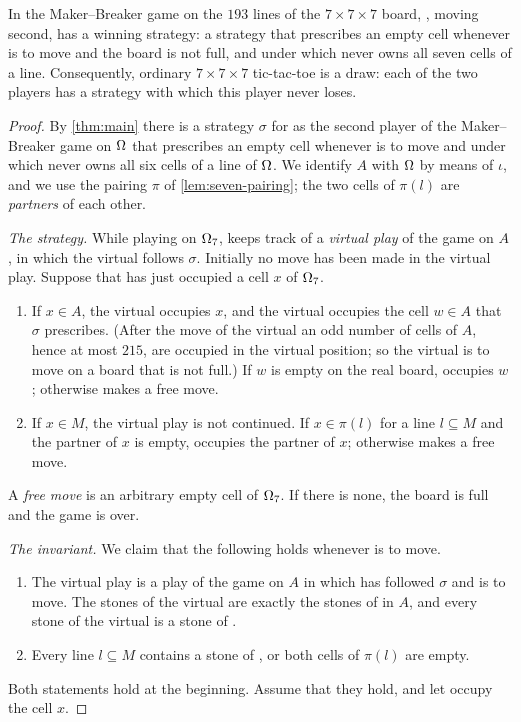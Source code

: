 \begin{corollary}\label{cor:seven}
In the Maker--Breaker game on the $193$ lines of the $7\times7\times7$ board, \Breaker, moving second,
has a winning strategy: a strategy that prescribes an empty cell whenever \Breaker{} is to move and the
board is not full, and under which \Maker{} never owns all seven cells of a line. Consequently, ordinary
$7\times7\times7$ tic-tac-toe is a draw: each of the two players has a strategy with which this player
never loses.
\end{corollary}

\begin{proof}
By \cref{thm:main} there is a strategy $\sigma$ for \Breaker{} as the second player of the Maker--Breaker
game on $\Omega$ that prescribes an empty cell whenever \Breaker{} is to move and under which \Maker{} never
owns all six cells of a line of $\Omega$. We identify $A$ with $\Omega$ by means of $\iota$, and we use the
pairing $\pi$ of \cref{lem:seven-pairing}; the two cells of $\pi(l)$ are \emph{partners} of each
other.

\smallskip\noindent\emph{The strategy.} While playing on $\Omega_7$, \Breaker{} keeps track of a
\emph{virtual play} of the game on $A$, in which the virtual \Breaker{} follows $\sigma$. Initially no
move has been made in the virtual play. Suppose that \Maker{} has just occupied a cell $x$ of $\Omega_7$.
\begin{enumerate}[label=\textup{(\roman*)}]
\item If $x\in A$, the virtual \Maker{} occupies $x$, and the virtual \Breaker{} occupies the cell $w\in A$
      that $\sigma$ prescribes. (After the move of the virtual \Maker{} an odd number of cells of $A$, hence
      at most $215$, are occupied in the virtual position; so the virtual \Breaker{} is to move on a board
      that is not full.) If $w$ is empty on the real board, \Breaker{} occupies $w$; otherwise \Breaker{}
      makes a free move.
\item If $x\in M$, the virtual play is not continued. If $x\in\pi(l)$ for a line $l\subseteq M$ and
      the partner of $x$ is empty, \Breaker{} occupies the partner of $x$; otherwise \Breaker{} makes a free
      move.
\end{enumerate}
A \emph{free move} is an arbitrary empty cell of $\Omega_7$. If there is none, the board is full and the
game is over.

\smallskip\noindent\emph{The invariant.} We claim that the following holds whenever \Maker{} is to move.
\begin{enumerate}[label=\textup{(J\arabic*)}]
\item The virtual play is a play of the game on $A$ in which \Breaker{} has followed $\sigma$ and
      \Maker{} is to move. The stones of the virtual \Maker{} are exactly the stones of \Maker{} in $A$,
      and every stone of the virtual \Breaker{} is a stone of \Breaker.
\item Every line $l\subseteq M$ contains a stone of \Breaker, or both cells of $\pi(l)$ are empty.
\end{enumerate}
Both statements hold at the beginning. Assume that they hold, and let \Maker{} occupy the cell $x$.


\end{proof}
